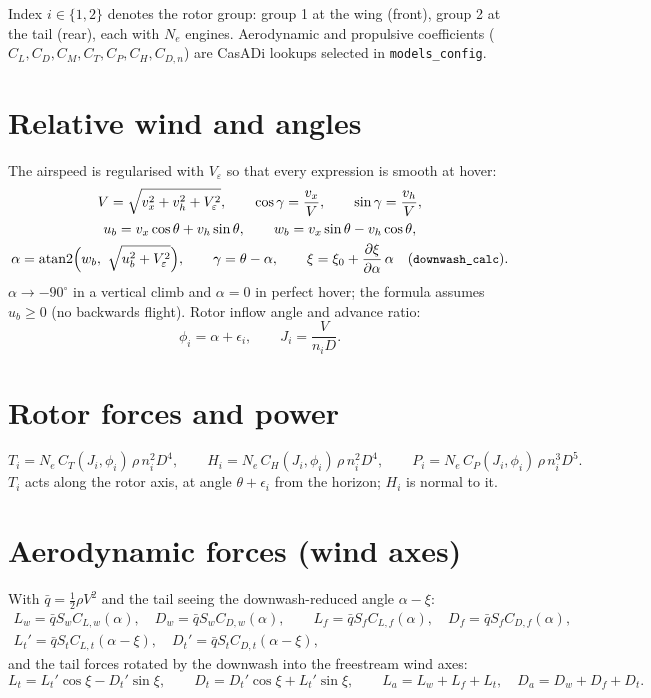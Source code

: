 \documentclass[10pt,a4paper]{article}
\newcommand{\code}[1]{\texttt{\small #1}}
\begin{document}
Index $i\in\{1,2\}$ denotes the rotor group: group 1 at the wing (front), group 2 at the tail (rear),
each with $N_e$ engines. Aerodynamic and propulsive coefficients
($C_L, C_D, C_M, C_T, C_P, C_H, C_{D,n}$) are CasADi lookups selected in \code{models\_config}.

\section{Relative wind and angles}

The airspeed is regularised with $V_\varepsilon$ so that every expression is smooth at hover:
\begin{gather}
V = \sqrt{v_x^2 + v_h^2 + V_\varepsilon^2}, \qquad \cos\gamma = \frac{v_x}{V}, \qquad \sin\gamma = \frac{v_h}{V}, \\
u_b = v_x\cos\theta + v_h\sin\theta, \qquad w_b = v_x\sin\theta - v_h\cos\theta, \\
\alpha = \operatorname{atan2}\!\Big(w_b,\ \sqrt{u_b^2 + V_\varepsilon^2}\Big), \qquad \gamma = \theta - \alpha, \qquad
\xi = \xi_0 + \frac{\partial \xi}{\partial \alpha}\,\alpha \quad (\code{downwash\_calc}).
\end{gather}
$\alpha \to -90^\circ$ in a vertical climb and $\alpha=0$ in perfect hover; the formula assumes $u_b \ge 0$ (no backwards flight).
Rotor inflow angle and advance ratio:
\begin{equation}
\phi_i = \alpha + \epsilon_i, \qquad J_i = \frac{V}{n_i D}.
\end{equation}

\section{Rotor forces and power}

\begin{equation}
T_i = N_e\, C_T(J_i,\phi_i)\, \rho\, n_i^2 D^4, \qquad
H_i = N_e\, C_H(J_i,\phi_i)\, \rho\, n_i^2 D^4, \qquad
P_i = N_e\, C_P(J_i,\phi_i)\, \rho\, n_i^3 D^5 .
\end{equation}
$T_i$ acts along the rotor axis, at angle $\theta+\epsilon_i$ from the horizon; $H_i$ is normal to it.

\section{Aerodynamic forces (wind axes)}

With $\bar q = \tfrac12 \rho V^2$ and the tail seeing the downwash-reduced angle $\alpha - \xi$:
\begin{gather}
L_w = \bar q S_w C_{L,w}(\alpha), \quad D_w = \bar q S_w C_{D,w}(\alpha), \qquad
L_f = \bar q S_f C_{L,f}(\alpha), \quad D_f = \bar q S_f C_{D,f}(\alpha), \\
L_t' = \bar q S_t C_{L,t}(\alpha-\xi), \quad D_t' = \bar q S_t C_{D,t}(\alpha-\xi),
\end{gather}
and the tail forces rotated by the downwash into the freestream wind axes:
\begin{equation}
L_t = L_t'\cos\xi - D_t'\sin\xi, \qquad D_t = D_t'\cos\xi + L_t'\sin\xi, \qquad
L_a = L_w + L_f + L_t, \quad D_a = D_w + D_f + D_t .
\end{equation}
\end{document}
